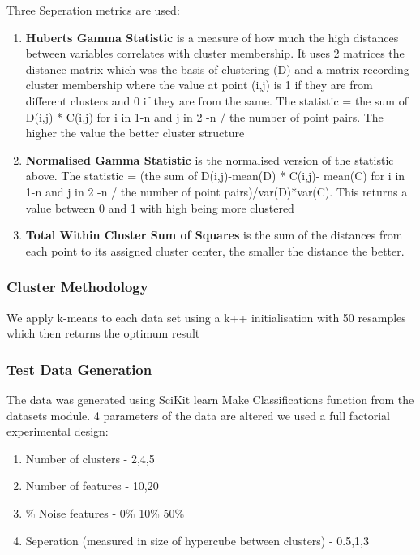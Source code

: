\documentclass[
]{article}
\providecommand{\tightlist}{%
  \setlength{\itemsep}{0pt}\setlength{\parskip}{0pt}}
\begin{document}
Three Seperation metrics are used:

\begin{enumerate}
\def\labelenumi{\arabic{enumi}.}
\item
  \textbf{Huberts Gamma Statistic} is a measure of how much the high
  distances between variables correlates with cluster membership. It
  uses 2 matrices the distance matrix which was the basis of clustering
  (D) and a matrix recording cluster membership where the value at point
  (i,j) is 1 if they are from different clusters and 0 if they are from
  the same. The statistic = the sum of D(i,j) * C(i,j) for i in 1-n and
  j in 2 -n / the number of point pairs. The higher the value the better
  cluster structure
\item
  \textbf{Normalised Gamma Statistic} is the normalised version of the
  statistic above. The statistic = (the sum of D(i,j)-mean(D) * C(i,j)-
  mean(C) for i in 1-n and j in 2 -n / the number of point
  pairs)/var(D)*var(C). This returns a value between 0 and 1 with high
  being more clustered
\item
  \textbf{Total Within Cluster Sum of Squares} is the sum of the
  distances from each point to its assigned cluster center, the smaller
  the distance the better.
\end{enumerate}

\hypertarget{cluster-methodology}{%
\subsubsection{Cluster Methodology}\label{cluster-methodology}}

We apply k-means to each data set using a k++ initialisation with 50
resamples which then returns the optimum result

\hypertarget{test-data-generation}{%
\subsubsection{Test Data Generation}\label{test-data-generation}}

The data was generated using SciKit learn Make Classifications function
from the datasets module. 4 parameters of the data are altered we used a
full factorial experimental design:

\begin{enumerate}
\def\labelenumi{\arabic{enumi}.}
\tightlist
\item
  Number of clusters - 2,4,5
\item
  Number of features - 10,20
\item
  \% Noise features - 0\% 10\% 50\%
\item
  Seperation (measured in size of hypercube between clusters) - 0.5,1,3
\end{enumerate}
\end{document}
